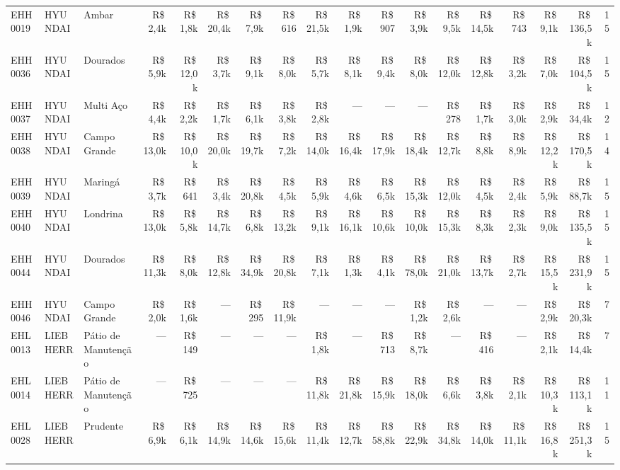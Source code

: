 \begin{landscape}
\begin{longtable}{@{}ll>{\raggedright\arraybackslash}p{2.2cm}rrrrrrrrrrrrrrr@{}}
EHH0019 & HYUNDAI & Ambar & R\$\,2,4k & R\$\,1,8k & R\$\,20,4k & R\$\,7,9k & R\$\,616 & R\$\,21,5k & R\$\,1,9k & R\$\,907 & R\$\,3,9k & R\$\,9,5k & R\$\,14,5k & R\$\,743 & R\$\,9,1k & R\$\,136,5k & 15 \\
EHH0036 & HYUNDAI & Dourados & R\$\,5,9k & R\$\,12,0k & R\$\,3,7k & R\$\,9,1k & R\$\,8,0k & R\$\,5,7k & R\$\,8,1k & R\$\,9,4k & R\$\,8,0k & R\$\,12,0k & R\$\,12,8k & R\$\,3,2k & R\$\,7,0k & R\$\,104,5k & 15 \\
EHH0037 & HYUNDAI & Multi Aço & R\$\,4,4k & R\$\,2,2k & R\$\,1,7k & R\$\,6,1k & R\$\,3,8k & R\$\,2,8k & --- & --- & --- & R\$\,278 & R\$\,1,7k & R\$\,3,0k & R\$\,2,9k & R\$\,34,4k & 12 \\
EHH0038 & HYUNDAI & Campo Grande & R\$\,13,0k & R\$\,10,0k & R\$\,20,0k & R\$\,19,7k & R\$\,7,2k & R\$\,14,0k & R\$\,16,4k & R\$\,17,9k & R\$\,18,4k & R\$\,12,7k & R\$\,8,8k & R\$\,8,9k & R\$\,12,2k & R\$\,170,5k & 14 \\
EHH0039 & HYUNDAI & Maringá & R\$\,3,7k & R\$\,641 & R\$\,3,4k & R\$\,20,8k & R\$\,4,5k & R\$\,5,9k & R\$\,4,6k & R\$\,6,5k & R\$\,15,3k & R\$\,12,0k & R\$\,4,5k & R\$\,2,4k & R\$\,5,9k & R\$\,88,7k & 15 \\
EHH0040 & HYUNDAI & Londrina & R\$\,13,0k & R\$\,5,8k & R\$\,14,7k & R\$\,6,8k & R\$\,13,2k & R\$\,9,1k & R\$\,16,1k & R\$\,10,6k & R\$\,10,0k & R\$\,15,3k & R\$\,8,3k & R\$\,2,3k & R\$\,9,0k & R\$\,135,5k & 15 \\
EHH0044 & HYUNDAI & Dourados & R\$\,11,3k & R\$\,8,0k & R\$\,12,8k & R\$\,34,9k & R\$\,20,8k & R\$\,7,1k & R\$\,1,3k & R\$\,4,1k & R\$\,78,0k & R\$\,21,0k & R\$\,13,7k & R\$\,2,7k & R\$\,15,5k & R\$\,231,9k & 15 \\
EHH0046 & HYUNDAI & Campo Grande & R\$\,2,0k & R\$\,1,6k & --- & R\$\,295 & R\$\,11,9k & --- & --- & --- & R\$\,1,2k & R\$\,2,6k & --- & --- & R\$\,2,9k & R\$\,20,3k & 7 \\
EHL0013 & LIEBHERR & Pátio de Manutenção & --- & R\$\,149 & --- & --- & --- & R\$\,1,8k & --- & R\$\,713 & R\$\,8,7k & --- & R\$\,416 & --- & R\$\,2,1k & R\$\,14,4k & 7 \\
EHL0014 & LIEBHERR & Pátio de Manutenção & --- & R\$\,725 & --- & --- & --- & R\$\,11,8k & R\$\,21,8k & R\$\,15,9k & R\$\,18,0k & R\$\,6,6k & R\$\,3,8k & R\$\,2,1k & R\$\,10,3k & R\$\,113,1k & 11 \\
EHL0028 & LIEBHERR & Prudente & R\$\,6,9k & R\$\,6,1k & R\$\,14,9k & R\$\,14,6k & R\$\,15,6k & R\$\,11,4k & R\$\,12,7k & R\$\,58,8k & R\$\,22,9k & R\$\,34,8k & R\$\,14,0k & R\$\,11,1k & R\$\,16,8k & R\$\,251,3k & 15 \\

\end{longtable}
\end{landscape}
